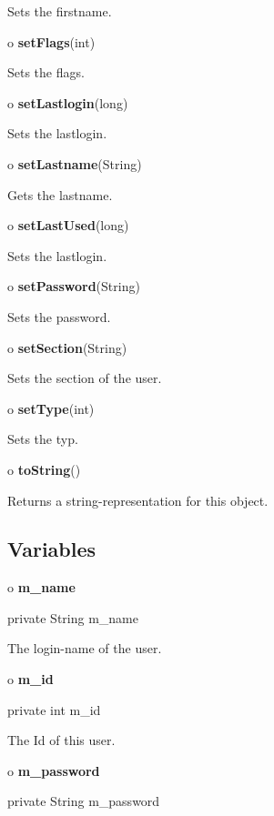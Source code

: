\begin{description}
Sets the firstname.  
\item o {\bf setFlags}(int)  

Sets the flags.  
\item o {\bf setLastlogin}(long)  

Sets the lastlogin.  
\item o {\bf setLastname}(String)  

Gets the lastname.  
\item o {\bf setLastUsed}(long)  

Sets the lastlogin.  
\item o {\bf setPassword}(String)  

Sets the password.  
\item o {\bf setSection}(String)  

Sets the section of the user.  
\item o {\bf setType}(int)  

Sets the typ.  
\item o {\bf toString}()  

Returns a string-representation for this object. 
\end{description}

\subsection*{  Variables }

o {\bf m\_name} 

\begin{PRE}
 private String m\_name
\end{PRE}

\begin{description}
\htmlDD The login-name of the user.

\end{description}

o {\bf m\_id} 

\begin{PRE}
 private int m\_id
\end{PRE}

\begin{description}
\htmlDD The Id of this user.

\end{description}

o {\bf m\_password} 

\begin{PRE}
 private String m\_password
\end{PRE}

